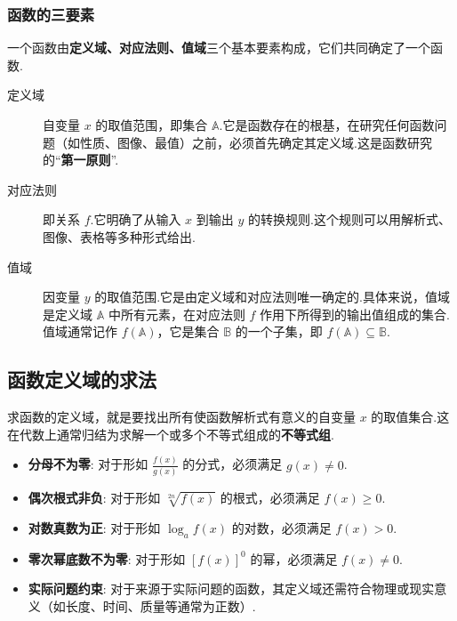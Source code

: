 \subsubsection*{函数的三要素}
一个函数由\textbf{定义域、对应法则、值域}三个基本要素构成，它们共同确定了一个函数.
\begin{description}
	\item[定义域 ] 自变量 $x$ 的取值范围，即集合 $\mathbb{A}$.它是函数存在的根基，在研究任何函数问题（如性质、图像、最值）之前，必须首先确定其定义域.这是函数研究的“\textbf{第一原则}”.
	\item[对应法则] 即关系 $f$.它明确了从输入 $x$ 到输出 $y$ 的转换规则.这个规则可以用解析式、图像、表格等多种形式给出.
	\item[值域] 因变量 $y$ 的取值范围.它是由定义域和对应法则唯一确定的.具体来说，值域是定义域 $\mathbb{A}$ 中所有元素，在对应法则 $f$ 作用下所得到的输出值组成的集合.值域通常记作 $f(\mathbb{A})$，它是集合 $\mathbb{B}$ 的一个子集，即 $f(\mathbb{A}) \subseteq \mathbb{B}$.
\end{description}

\subsection{函数定义域的求法}

求函数的定义域，就是要找出所有使函数解析式有意义的自变量 $x$ 的取值集合.这在代数上通常归结为求解一个或多个不等式组成的\textbf{不等式组}.

\begin{note}[常见解析式的限制条件]
	\begin{itemize}
		\item \textbf{分母不为零}: 对于形如 $\frac{f(x)}{g(x)}$ 的分式，必须满足 $g(x) \neq 0$.
		\item \textbf{偶次根式非负}: 对于形如 $\sqrt[2n]{f(x)}$ 的根式，必须满足 $f(x) \ge 0$.
		\item \textbf{对数真数为正}: 对于形如 $\log_a f(x)$ 的对数，必须满足 $f(x) > 0$.
		\item \textbf{零次幂底数不为零}: 对于形如 $[f(x)]^0$ 的幂，必须满足 $f(x) \neq 0$.
		\item \textbf{实际问题约束}: 对于来源于实际问题的函数，其定义域还需符合物理或现实意义（如长度、时间、质量等通常为正数）.
	\end{itemize}
\end{note}

